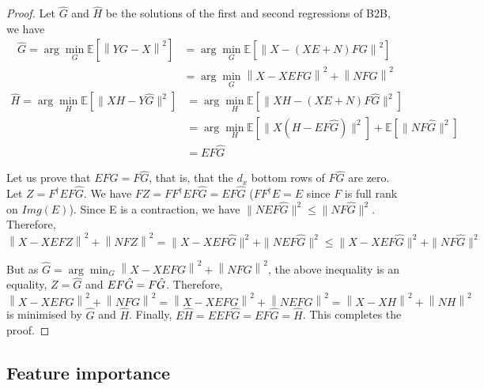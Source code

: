 \begin{proof}

 Let $\hat G$ and $\hat H$ be the solutions of the first and second regressions of B2B, we have
 \begin{align*}
    \hat G = \arg \min_G \mathbb{E}[\left \| YG - X \right \|^2] &=   \arg \min_G \mathbb{E}[\left \| X - (XE + N)FG \right\|^2]\\
                                                        &{}= \arg \min_G \left \| X - XEFG\right\| ^2  + \left \| NFG\right \| ^2
     \label{eq:doublenorm}
\end{align*}
\begin{align*}
    \hat H = \arg \min_H \mathbb{E}[\| XH - Y \hat{G} \|^2] &=\arg  \min_H \mathbb{E}[\| XH - (XE + N)F \hat G \|^2] \\
    &=\arg \min_H \mathbb{E}[\| X(H - EF \hat G) \| ^2] + \mathbb{E}[\| NF\hat G \| ^2]\\
    &= EF \hat G
\end{align*}

Let us prove that $EF\hat G = F\hat G$, that is, that the $d_x$ bottom rows of $F\hat G$ are zero. Let $Z=F^\dagger EF\hat G$. We have $FZ = FF^\dagger EF  \hat G= EF\hat G$ ($FF^\dagger E =E$ since $F$ is full rank on $Img(E)$). Since E is a contraction, we have $ \| NEF\hat G\|^2 \leq \| NF\hat G \|^2$. Therefore,
 $$\left \| X - XEFZ\right \| ^2  + \left \| NFZ\right \| ^2 = \| X - XEF\hat G \| ^2  + \| NEF\hat G \| ^2 \leq \| X - XEF\hat G \| ^2  + \| NF\hat G \| ^2$$

But as $\hat G =  \arg \min_G \left \| X - XEFG\right\| ^2  + \left \| NFG\right \| ^2$, the above inequality is an equality, $Z=\hat G$ and $EF\hat G = F\Hat G$. Therefore, $\left \| X - XEFG\right \| ^2  + \left \| NFG\right \| ^2 = \left \| X - XEFG\right \| ^2  + \left \| NEFG\right \| ^2 = \left \| X - XH\right \| ^2  + \left \| NH\right \| ^2$ is minimised by $\hat G$ and $\hat H$. Finally, $E\hat H = E EF\hat G = EF\hat G = \hat H$. This completes the proof.
\end{proof}

\newpage
\subsection{Feature importance}
\label{appendix:feature_importance}

